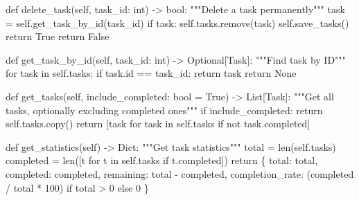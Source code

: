 \documentclass[
  letterpaper,
  DIV=11,
  numbers=noendperiod,
  oneside]{scrreprt}
\newenvironment{Shaded}{}{}
\newcommand{\BuiltInTok}[1]{\textcolor[rgb]{0.84,0.23,0.29}{#1}}
\newcommand{\CommentTok}[1]{\textcolor[rgb]{0.42,0.45,0.49}{#1}}
\newcommand{\ControlFlowTok}[1]{\textcolor[rgb]{0.84,0.23,0.29}{#1}}
\newcommand{\DecValTok}[1]{\textcolor[rgb]{0.00,0.36,0.77}{#1}}
\newcommand{\KeywordTok}[1]{\textcolor[rgb]{0.84,0.23,0.29}{#1}}
\newcommand{\NormalTok}[1]{\textcolor[rgb]{0.14,0.16,0.18}{#1}}
\newcommand{\OperatorTok}[1]{\textcolor[rgb]{0.14,0.16,0.18}{#1}}
\newcommand{\StringTok}[1]{\textcolor[rgb]{0.01,0.18,0.38}{#1}}
\newcommand{\VariableTok}[1]{\textcolor[rgb]{0.89,0.38,0.04}{#1}}
\begin{document}
\begin{Shaded}
\begin{Highlighting}[]
    \KeywordTok{def}\NormalTok{ delete\_task(}\VariableTok{self}\NormalTok{, task\_id: }\BuiltInTok{int}\NormalTok{) }\OperatorTok{{-}\textgreater{}} \BuiltInTok{bool}\NormalTok{:}
        \CommentTok{"""Delete a task permanently"""}
\NormalTok{        task }\OperatorTok{=} \VariableTok{self}\NormalTok{.get\_task\_by\_id(task\_id)}
        \ControlFlowTok{if}\NormalTok{ task:}
            \VariableTok{self}\NormalTok{.tasks.remove(task)}
            \VariableTok{self}\NormalTok{.save\_tasks()}
            \ControlFlowTok{return} \VariableTok{True}
        \ControlFlowTok{return} \VariableTok{False}
    
    \KeywordTok{def}\NormalTok{ get\_task\_by\_id(}\VariableTok{self}\NormalTok{, task\_id: }\BuiltInTok{int}\NormalTok{) }\OperatorTok{{-}\textgreater{}}\NormalTok{ Optional[Task]:}
        \CommentTok{"""Find task by ID"""}
        \ControlFlowTok{for}\NormalTok{ task }\KeywordTok{in} \VariableTok{self}\NormalTok{.tasks:}
            \ControlFlowTok{if}\NormalTok{ task.}\BuiltInTok{id} \OperatorTok{==}\NormalTok{ task\_id:}
                \ControlFlowTok{return}\NormalTok{ task}
        \ControlFlowTok{return} \VariableTok{None}
    
    \KeywordTok{def}\NormalTok{ get\_tasks(}\VariableTok{self}\NormalTok{, include\_completed: }\BuiltInTok{bool} \OperatorTok{=} \VariableTok{True}\NormalTok{) }\OperatorTok{{-}\textgreater{}}\NormalTok{ List[Task]:}
        \CommentTok{"""Get all tasks, optionally excluding completed ones"""}
        \ControlFlowTok{if}\NormalTok{ include\_completed:}
            \ControlFlowTok{return} \VariableTok{self}\NormalTok{.tasks.copy()}
        \ControlFlowTok{return}\NormalTok{ [task }\ControlFlowTok{for}\NormalTok{ task }\KeywordTok{in} \VariableTok{self}\NormalTok{.tasks }\ControlFlowTok{if} \KeywordTok{not}\NormalTok{ task.completed]}
    
    \KeywordTok{def}\NormalTok{ get\_statistics(}\VariableTok{self}\NormalTok{) }\OperatorTok{{-}\textgreater{}}\NormalTok{ Dict:}
        \CommentTok{"""Get task statistics"""}
\NormalTok{        total }\OperatorTok{=} \BuiltInTok{len}\NormalTok{(}\VariableTok{self}\NormalTok{.tasks)}
\NormalTok{        completed }\OperatorTok{=} \BuiltInTok{len}\NormalTok{([t }\ControlFlowTok{for}\NormalTok{ t }\KeywordTok{in} \VariableTok{self}\NormalTok{.tasks }\ControlFlowTok{if}\NormalTok{ t.completed])}
        \ControlFlowTok{return}\NormalTok{ \{}
            \StringTok{\textquotesingle{}total\textquotesingle{}}\NormalTok{: total,}
            \StringTok{\textquotesingle{}completed\textquotesingle{}}\NormalTok{: completed,}
            \StringTok{\textquotesingle{}remaining\textquotesingle{}}\NormalTok{: total }\OperatorTok{{-}}\NormalTok{ completed,}
            \StringTok{\textquotesingle{}completion\_rate\textquotesingle{}}\NormalTok{: (completed }\OperatorTok{/}\NormalTok{ total }\OperatorTok{*} \DecValTok{100}\NormalTok{) }\ControlFlowTok{if}\NormalTok{ total }\OperatorTok{\textgreater{}} \DecValTok{0} \ControlFlowTok{else} \DecValTok{0}
\NormalTok{        \}}
    

\end{Highlighting}
\end{Shaded}
\end{document}

